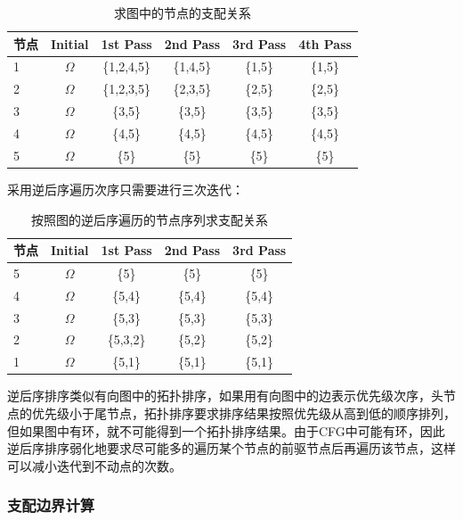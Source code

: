 \begin{table}[htb]
  \centering\small
  \caption{求图中的节点的支配关系}
  \label{tab:domcal0}
  \begin{tabular}{@{}lccccc@{}}
    \toprule
    节点   & Initial & 1st Pass & 2nd Pass & 3rd Pass & 4th Pass            \\
    \midrule
    1 &$\Omega$& \{1,2,4,5\} & \{1,4,5\} & \{1,5\} & \{1,5\} \\
    2 &$\Omega$& \{1,2,3,5\} & \{2,3,5\} & \{2,5\} & \{2,5\} \\
    3 &$\Omega$& \{3,5\} & \{3,5\} & \{3,5\} & \{3,5\} \\
    4 &$\Omega$& \{4,5\} & \{4,5\} & \{4,5\} & \{4,5\} \\
    5 &$\Omega$& \{5\} & \{5\} & \{5\} & \{5\} \\    
    \bottomrule
  \end{tabular}
\end{table}
采用逆后序遍历次序只需要进行三次迭代：

\begin{table}[htb]
  \centering\small
  \caption{按照图的逆后序遍历的节点序列求支配关系}
  \label{tab:domcal1}
  \begin{tabular}{@{}lcccc@{}}
    \toprule
    节点   & Initial & 1st Pass & 2nd Pass & 3rd Pass             \\
    \midrule
     5 & $\Omega$ & \{5\}  & \{5\} & \{5\} \\
     4 & $\Omega$ & \{5,4\} & \{5,4\} & \{5,4\} \\
     3 & $\Omega$ & \{5,3\} & \{5,3\} & \{5,3\} \\
     2 & $\Omega$ & \{5,3,2\} & \{5,2\} & \{5,2\} \\
     1 & $\Omega$ & \{5,1\} & \{5,1\} & \{5,1\} \\
        \bottomrule
  \end{tabular}
\end{table}

逆后序排序类似有向图中的拓扑排序，如果用有向图中的边表示优先级次序，头节点的优先级小于尾节点，拓扑排序要求排序结果按照优先级从高到低的顺序排列，但如果图中有环，就不可能得到一个拓扑排序结果。由于CFG中可能有环，因此逆后序排序弱化地要求尽可能多的遍历某个节点的前驱节点后再遍历该节点，这样可以减小迭代到不动点的次数。


\subsubsection{支配边界计算}

